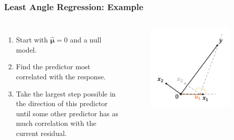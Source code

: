\begin{frame}
\frametitle{Least Angle Regression: Example}
\begin{columns}[t]
    \begin{enumerate}
        \item Start with $\hat{\mathbf{\mu}}=0$ and a null model.
        \item Find the predictor most correlated with the response.
        \item Take the largest step possible in the direction of this predictor until some other predictor has as much correlation with the current residual.
    \end{enumerate}
    
    \begin{figure}[!htbp]
        \begin{center}
            \includegraphics[width=0.9\textwidth]{img/LAR/3.jpeg}
        \end{center}
    \end{figure}
\end{columns}
\end{frame}

